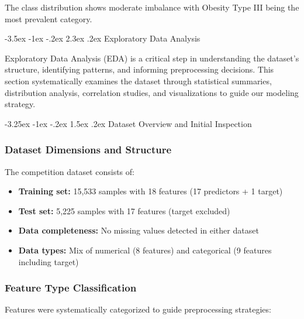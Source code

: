 \documentclass[12pt,a4paper]{article}
\makeatletter
\renewcommand{\section}{\@startsection{section}{1}{\z@}%
                                   {-3.5ex \@plus -1ex \@minus -.2ex}%
                                   {2.3ex \@plus .2ex}%
                                   {\normalfont\Large\bfseries\vspace{0.5\baselineskip}}}
\renewcommand{\subsection}{\@startsection{subsection}{2}{\z@}%
                                   {-3.25ex \@plus -1ex \@minus -.2ex}%
                                   {1.5ex \@plus .2ex}%
                                   {\normalfont\large\bfseries\vspace{0.3\baselineskip}}}
\makeatother
\begin{document}
The class distribution shows moderate imbalance with Obesity Type III being the most prevalent category.

\newpage

\section{Exploratory Data Analysis}

Exploratory Data Analysis (EDA) is a critical step in understanding the dataset's structure, identifying patterns, and informing preprocessing decisions. This section systematically examines the dataset through statistical summaries, distribution analysis, correlation studies, and visualizations to guide our modeling strategy.

\subsection{Dataset Overview and Initial Inspection}

\subsubsection{Dataset Dimensions and Structure}
The competition dataset consists of:
\begin{itemize}
    \item \textbf{Training set:} 15,533 samples with 18 features (17 predictors + 1 target)
    \item \textbf{Test set:} 5,225 samples with 17 features (target excluded)
    \item \textbf{Data completeness:} No missing values detected in either dataset
    \item \textbf{Data types:} Mix of numerical (8 features) and categorical (9 features including target)
\end{itemize}

\subsubsection{Feature Type Classification}
Features were systematically categorized to guide preprocessing strategies:
\end{document}
